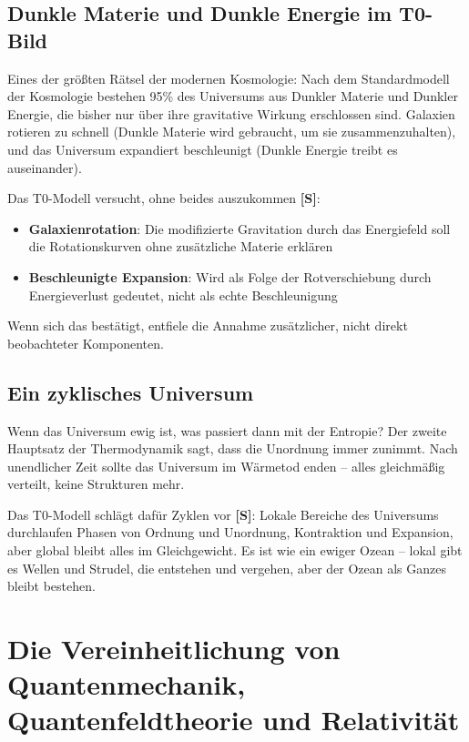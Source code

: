 	\subsection{Dunkle Materie und Dunkle Energie im T0-Bild}
	
	Eines der größten Rätsel der modernen Kosmologie: Nach dem Standardmodell der Kosmologie bestehen 95\% des Universums aus Dunkler Materie und Dunkler Energie, die bisher nur über ihre gravitative Wirkung erschlossen sind. Galaxien rotieren zu schnell (Dunkle Materie wird gebraucht, um sie zusammenzuhalten), und das Universum expandiert beschleunigt (Dunkle Energie treibt es auseinander).
	
	Das T0-Modell versucht, ohne beides auszukommen \textbf{[S]}:
	\begin{itemize}
		\item \textbf{Galaxienrotation}: Die modifizierte Gravitation durch das Energiefeld soll die Rotationskurven ohne zusätzliche Materie erklären
			\item \textbf{Beschleunigte Expansion}: Wird als Folge der Rotverschiebung durch Energieverlust gedeutet, nicht als echte Beschleunigung
	\end{itemize}

	Wenn sich das bestätigt, entfiele die Annahme zusätzlicher, nicht direkt beobachteter Komponenten.
	
	\subsection{Ein zyklisches Universum}
	
	Wenn das Universum ewig ist, was passiert dann mit der Entropie? Der zweite Hauptsatz der Thermodynamik sagt, dass die Unordnung immer zunimmt. Nach unendlicher Zeit sollte das Universum im Wärmetod enden -- alles gleichmäßig verteilt, keine Strukturen mehr.
	
	Das T0-Modell schlägt dafür Zyklen vor \textbf{[S]}: Lokale Bereiche des Universums durchlaufen Phasen von Ordnung und Unordnung, Kontraktion und Expansion, aber global bleibt alles im Gleichgewicht. Es ist wie ein ewiger Ozean -- lokal gibt es Wellen und Strudel, die entstehen und vergehen, aber der Ozean als Ganzes bleibt bestehen.
	
	\section{Die Vereinheitlichung von Quantenmechanik, Quantenfeldtheorie und Relativität}
	
